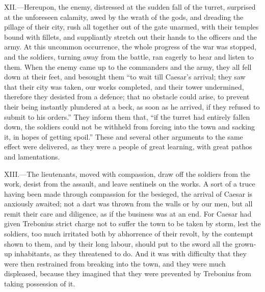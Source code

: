XII.—Hereupon, the enemy, distressed at the sudden fall of the turret,
surprised at the unforeseen calamity, awed by the wrath of the gods, and
dreading the pillage of their city, rush all together out of the gate
unarmed, with their temples bound with fillets, and suppliantly stretch
out their hands to the officers and the army. At this uncommon
occurrence, the whole progress of the war was stopped, and the soldiers,
turning away from the battle, ran eagerly to hear and listen to them.
When the enemy came up to the commanders and the army, they all fell
down at their feet, and besought them ``to wait till Caesar's arrival;
they saw that their city was taken, our works completed, and their tower
undermined, therefore they desisted from a defence; that no obstacle
could arise, to prevent their being instantly plundered at a beck, as
soon as he arrived, if they refused to submit to his orders.'' They
inform them that, ``if the turret had entirely fallen down, the soldiers
could not be withheld from forcing into the town and sacking it, in
hopes of getting spoil.'' These and several other arguments to the same
effect were delivered, as they were a people of great learning, with
great pathos and lamentations.

XIII.—The lieutenants, moved with compassion, draw off the soldiers
from the work, desist from the assault, and leave sentinels on the
works. A sort of a truce having been made through compassion for the
besieged, the arrival of Caesar is anxiously awaited; not a dart was
thrown from the walls or by our men, but all remit their care and
diligence, as if the business was at an end. For Caesar had given
Trebonius strict charge not to suffer the town to be taken by storm,
lest the soldiers, too much irritated both by abhorrence of their
revolt, by the contempt shown to them, and by their long labour, should
put to the sword all the grown-up inhabitants, as they threatened to do.
And it was with difficulty that they were then restrained from breaking
into the town, and they were much displeased, because they imagined that
they were prevented by Trebonius from taking possession of it.


